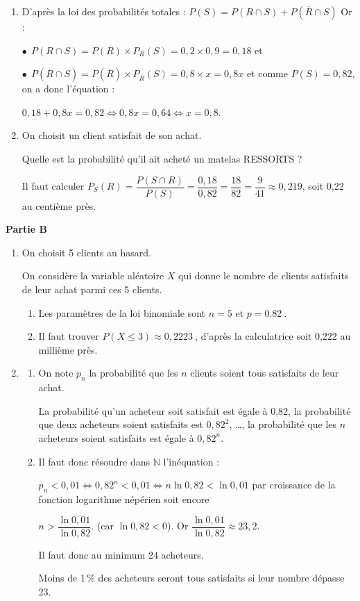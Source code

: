 \documentclass[10pt]{article}
\providecommand{\N}{\mathbb{N}}
\providecommand{\np}[2][]{{#2~#1}}
\begin{document}
\begin{enumerate}[start=2]
\item 
D'après la loi des probabilités totales :
$P(S) = P(R \cap S) + P\left(\overline{R} \cap S \right)$ Or :

$\bullet~~P(R \cap S) = P(R) \times P_R(S) = 0,2 \times 0,9 = 0,18$ et 

$\bullet~~P\left(\overline{R} \cap S \right) = P\left(\overline{R}\right) \times P_{\overline{R}}(S) = 0,8 \times x = 0,8x$ et comme $P(S) = 0,82$, on a donc l'équation :

$0,18 + 0,8x = 0,82 \iff 0,8x = 0,64 \iff x = 0,8$.
\item On choisit un client satisfait de son achat.

Quelle est la probabilité qu'il ait acheté un matelas RESSORTS ?


Il faut calculer $P_S(R) = \dfrac{P(S \cap R)}{P(S)} = \dfrac{0,18}{0,82} = \dfrac{18}{82} = \dfrac{9}{41} \approx 0,219$, soit 0,22 au centième près.
\end{enumerate}
\medskip

\medskip

\textbf{Partie B}

\medskip

\begin{enumerate}
\item On choisit 5 clients au hasard.

On considère la variable aléatoire $X$ qui donne le
nombre de clients satisfaits de leur achat parmi ces 5 clients.
	\begin{enumerate}
		\item 
Les paramètres de la loi binomiale sont $ n = 5 $ \quad et \quad  $ p=\np{0.82}$.
		\item 
		

Il faut trouver $P(X \leqslant 3) \approx \np{0,2223}$, d'après la calculatrice soit 0,222 au millième près.
	\end{enumerate}
\item 


	\begin{enumerate}
		\item On note $p_n$ la probabilité que les $n$ clients soient tous satisfaits de leur achat.


La probabilité qu'un acheteur soit satisfait est égale à 0,82, la probabilité que deux acheteurs soient satisfaits est $0,82^2$, \ldots, la probabilité que les $n$ acheteurs soient satisfaits est égale à $0,82^n$.
		\item 
		

Il faut donc résoudre dans $\N$ l'inéquation :

$p_n < 0,01 \iff 0,82^n < 0,01 \iff n \ln 0,82 < \ln 0,01$ par croissance de la fonction logarithme népérien soit encore 

$n > \dfrac{\ln 0,01}{\ln 0,82}$. (car $\ln 0,82 < 0$). Or $\dfrac{\ln 0,01}{\ln 0,82} \approx 23,2$.

Il faut donc au minimum 24 acheteurs.

Moins de 1\,\% des acheteurs seront tous satisfaits si leur nombre dépasse 23.
	\end{enumerate}
\end{enumerate}

\bigskip
\end{document}
